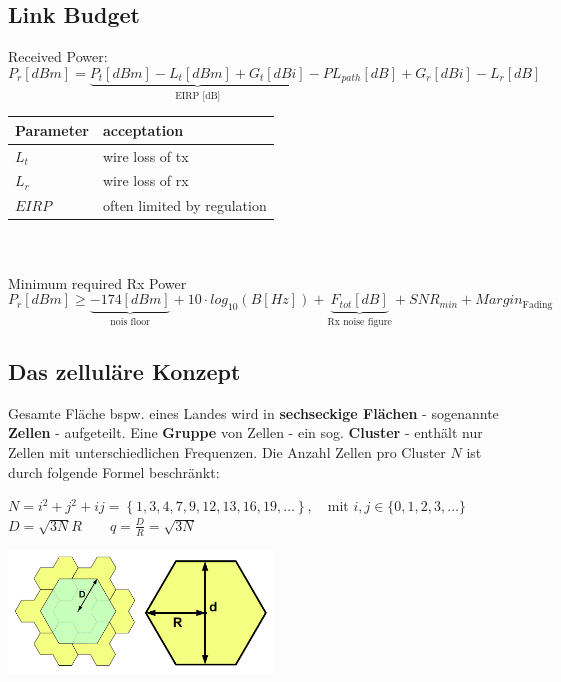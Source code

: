 \subsection{Link Budget}
Received Power:
\begin{equation*}
	P_r [dBm] = \underbrace{P_t [dBm] - L_t [dBm] + G_t[dBi]}_{\text{EIRP [dB]}} - PL_{path}[dB] + G_r[dBi] -L_r[dB]
\end{equation*}

\begin{tabular}{ll}
\textbf{Parameter} & \textbf{acceptation} \\ \hline
$L_t$ & wire loss of tx \\ 
$L_r$ & wire loss of rx \\ 
$EIRP$ & often limited by regulation \\ 
\end{tabular} \\ \\

Minimum required Rx Power
\begin{equation*}
	P_r [dBm] \geq \underbrace{-174[dBm]}_{\text{nois floor}} + 10 \cdot log_{10}(B [Hz]) + \underbrace{F_{tot}[dB]}_{\text{Rx noise figure}} + SNR_{min} + Margin_{\text{Fading}}
\end{equation*}

\subsection{Das zelluläre Konzept }
	\begin{minipage}{12cm}
		Gesamte Fläche bspw. eines Landes wird in \textbf{sechseckige Flächen} - sogenannte \textbf{Zellen} - aufgeteilt. 
		Eine \textbf{Gruppe} von Zellen - ein sog. \textbf{Cluster} - enthält nur Zellen mit unterschiedlichen Frequenzen.
		Die Anzahl Zellen pro Cluster $N$ ist durch folgende Formel beschränkt:
		\begin{center}
	        $ N=i^2+j^2+ij = \left\{1,3,4,7,9,12,13,16,19,\ldots\right\}, \quad \text{mit } i,j \in
	        \{0,1,2,3,\ldots \} $ \\ $ D = \sqrt{3N} R \qquad q = \frac{D}{R} =
	        \sqrt{3N} $
        \end{center}
	\end{minipage}
	\begin{minipage}{8cm}
	    \includegraphics[width=7cm]{./bilder/systems-cluster.png}
	\end{minipage}


